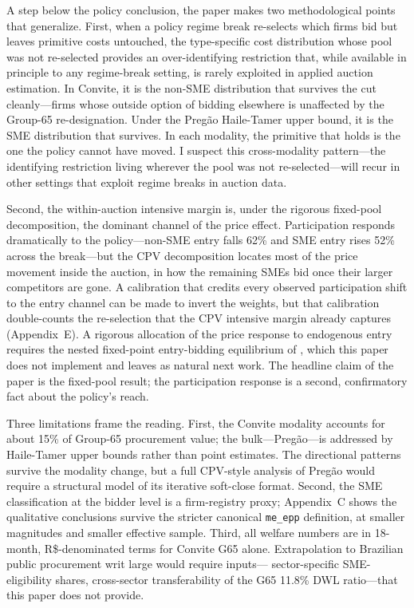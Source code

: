 \documentclass[12pt]{article}
\begin{document}
A step below the policy conclusion, the paper makes two methodological
points that generalize. First, when a policy regime break re-selects
which firms bid but leaves primitive costs untouched, the
type-specific cost distribution whose pool was not re-selected
provides an over-identifying restriction that, while available in
principle to any regime-break setting, is rarely exploited in
applied auction estimation. In Convite, it is the non-SME distribution
that survives the cut cleanly---firms whose outside option of bidding
elsewhere is unaffected by the Group-65 re-designation. Under the
Preg\~ao Haile-Tamer upper bound, it is the SME distribution that
survives. In each modality, the primitive that holds is the one the
policy cannot have moved. I suspect this cross-modality pattern---the
identifying restriction living wherever the pool was not
re-selected---will recur in other settings that exploit regime breaks
in auction data.

Second, the within-auction intensive margin is, under the rigorous
fixed-pool decomposition, the dominant channel of the price effect.
Participation responds dramatically to the policy---non-SME entry
falls 62\% and SME entry rises 52\% across the break---but the
CPV decomposition locates most of the price movement inside the
auction, in how the remaining SMEs bid once their larger
competitors are gone. A calibration that credits every observed
participation shift to the entry channel can be made to invert
the weights, but that calibration double-counts the re-selection
that the CPV intensive margin already captures (Appendix~E). A
rigorous allocation of the price response to endogenous entry
requires the nested fixed-point entry-bidding equilibrium of
\citet{atheyseira2011}, which this paper does not implement and
leaves as natural next work. The headline claim of the paper is
the fixed-pool result; the participation response is a second,
confirmatory fact about the policy's reach.

Three limitations frame the reading. First, the Convite modality
accounts for about 15\% of Group-65 procurement value; the
bulk---Preg\~ao---is addressed by Haile-Tamer upper bounds rather
than point estimates. The directional patterns survive the modality
change, but a full CPV-style analysis of Preg\~ao would require a
structural model of its iterative soft-close format. Second, the
SME classification at the bidder level is a firm-registry proxy;
Appendix~C shows the qualitative conclusions survive the stricter
canonical \texttt{me\_epp} definition, at smaller magnitudes and
smaller effective sample. Third, all welfare numbers are in
18-month, R\$-denominated terms for Convite G65 alone. Extrapolation
to Brazilian public procurement writ large would require inputs---
sector-specific SME-eligibility shares, cross-sector transferability
of the G65 11.8\% DWL ratio---that this paper does not provide.
\end{document}
